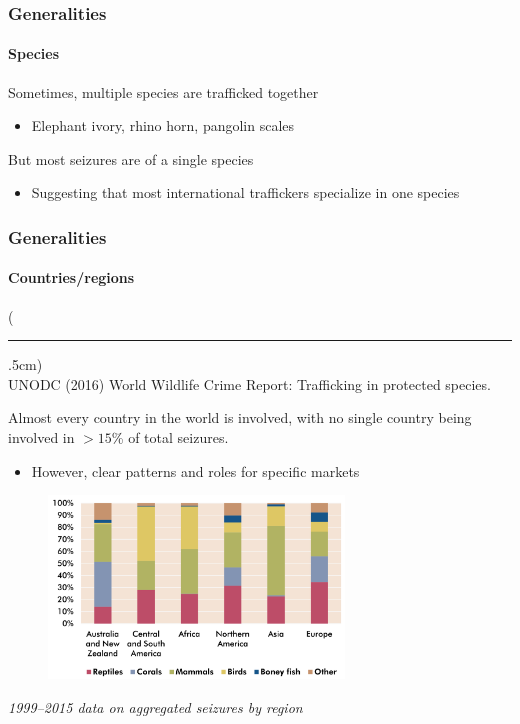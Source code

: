 \documentclass[10pt]{beamer}
\newenvironment{reference}[2]{%
	\begin{textblock*}{\textwidth}(#1,#2)
		\tiny\bgroup\color{gray}}{\egroup\end{textblock*}}
\begin{document}
\begin{frame}[t]
\frametitle{Generalities}
\framesubtitle{Species}
\vspace{0.5cm}

	Sometimes, multiple species are trafficked together\\
		\begin{itemize}
			\item Elephant ivory, rhino horn, pangolin scales\\
		\end{itemize}
	
	\bigskip	
	
	But most seizures are of a single species\\
		\begin{itemize}
			\item Suggesting that most international traffickers specialize in one species
		\end{itemize}
\end{frame}


\begin{frame}[t]
\frametitle{Generalities}
\framesubtitle{Countries/regions}
\vspace{0.25cm}

	\begin{reference}{4mm}{92mm}
		\rule{1.5cm}{0.25pt}\\
		UNODC (2016) World Wildlife Crime Report: Trafficking in protected species.
	\end{reference}

	Almost every country in the world is involved, with no single country being involved in $>15$\% of total seizures.
		\medskip
		\begin{itemize}
			\item However, clear patterns and roles for specific markets
		\end{itemize}
	
	\vspace{0.25cm}
	
	\begin{center}
		\begin{figure}
			\includegraphics[width=0.7\textwidth]{figures/regions.png}\\
		\end{figure}
		\footnotesize{\emph{1999--2015 data on aggregated seizures by region}}
	\end{center}
\end{frame}
\end{document}
